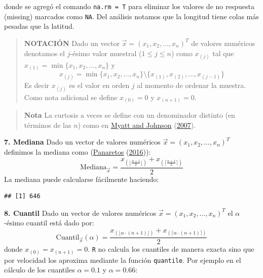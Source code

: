\documentclass[
]{book}
\newenvironment{Shaded}{\begin{snugshade}}{\end{snugshade}}
\newcommand{\FunctionTok}[1]{\textcolor[rgb]{0.00,0.00,0.00}{#1}}
\newcommand{\NormalTok}[1]{#1}
\newcommand{\SpecialCharTok}[1]{\textcolor[rgb]{0.00,0.00,0.00}{#1}}
\begin{document}
donde se agregó el comando \texttt{na.rm\ =\ T} para eliminar los valores de no respuesta (missing) marcados como \texttt{NA}. Del análisis notamos que la longitud tiene colas más pesadas que la latitud.

\begin{quote}
\textbf{NOTACIÓN} Dado un vector \(\vec{x} = (x_1, x_2, \dots, x_n)^T\) de valores numéricos denotamos el \(j\)-ésimo valor muestral (\(1 \leq j \leq n\)) como \(x_{(j)}\) tal que \(x_{(1)} = \min \{ x_1, x_2, \dots, x_n \}\) y
\[
x_{(j)} = \min \{ x_1, x_2, \dots, x_n \} \setminus \{ x_{(1)}, x_{(2)}, \dots, x_{(j-1)} \}
\]
Es decir \(x_{(j)}\) es el valor en orden \(j\) al momento de ordenar la muestra. Como nota adicional se define \(x_{(0)} = 0\) y \(x_{(n+1)} = 0\).
\end{quote}

\begin{quote}
\textbf{Nota} La curtosis a veces se define con un denominador distinto (en términos de las \(n\)) como en \protect\hyperlink{ref-myatt2007making}{Myatt and Johnson} (\protect\hyperlink{ref-myatt2007making}{2007}).
\end{quote}

\textbf{7. Mediana} Dado un vector de valores numéricos \(\vec{x} = (x_1, x_2, \dots, x_n)^T\) definimos la mediana como (\protect\hyperlink{ref-panaretos2016statistics}{Panaretos} (\protect\hyperlink{ref-panaretos2016statistics}{2016})):
\[
\text{Mediana}_{\vec{x}} = \dfrac{x_{(\lfloor \frac{n+1}{2} \rfloor)} + x_{(\lceil \frac{n+1}{2} \rceil)}}{2} 
\]
La mediana puede calcularse fácilmente haciendo:

\begin{Shaded}
\end{Shaded}

\begin{verbatim}
## [1] 646
\end{verbatim}

\textbf{8. Cuantil} Dado un vector de valores numéricos \(\vec{x} = (x_1, x_2, \dots, x_n)^T\) el \(\alpha\)-ésimo cuantil está dado por:
\[
\text{Cuantil}_{\vec{x}}(\alpha) = \dfrac{x_{(\lfloor \alpha\cdot (n+1) \rfloor)} + x_{(\lceil \alpha\cdot (n+1)\rceil)}}{2} 
\]
donde \(x_{(0)} = x_{(n+1)} = 0\). \texttt{R} no calcula los cuantiles de manera exacta sino que por velocidad los aproxima mediante la función \texttt{quantile}. Por ejemplo en el cálculo de los cuantiles \(\alpha = 0.1\) y \(\alpha = 0.66\):
\end{document}
